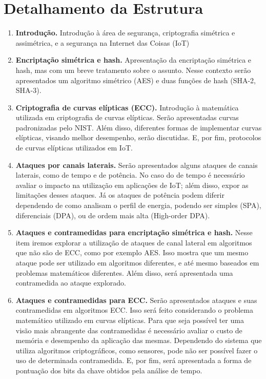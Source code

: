 \documentclass[12pt]{article}
\begin{document}
\section{Detalhamento da Estrutura}
\begin{enumerate}
\item \textbf{Introdução.} Introdu\c{c}\~ao à \'area de seguran\c{c}a, criptografia sim\'etrica e assim\'etrica, e a seguran\c{c}a na Internet das Coisas (IoT)

\item \textbf{Encripta\c{c}\~ao sim\'etrica e hash.} Apresenta\c{c}\~ao da encripta\c{c}\~ao sim\'etrica e hash, mas com um breve tratamento sobre o assunto. Nesse contexto ser\~ao apresentados um algoritmo sim\'etrico (AES) e duas funções de hash (SHA-2, SHA-3).

\item \textbf{Criptografia de curvas el\'ipticas (ECC).} Introdu\c{c}\~ao \`a matem\'atica utilizada em criptografia de curvas el\'ipticas. Ser\~ao apresentadas curvas padronizadas pelo NIST. Al\'em disso, diferentes formas de implementar curvas el\'ipticas, visando melhor desempenho, serão discutidas. E, por fim, protocolos de curvas el\'ipticas utilizados em IoT.

\item \textbf{Ataques por canais laterais.} Ser\~ao apresentados alguns ataques de canais laterais, como de tempo e de pot\^encia. No caso do de tempo \'e necess\'ario avaliar o impacto na utiliza\c{c}\~ao em aplica\c{c}\~oes de IoT; al\'em disso, expor as limita\c{c}\~oes desses ataques. J\'a os ataques de pot\^encia podem diferir  dependendo de como analisam o perfil de energia, podendo ser simples (SPA), diferenciais (DPA), ou de ordem mais alta (High-order DPA).

\item \textbf{Ataques e contramedidas para encripta\c{c}\~ao sim\'etrica e hash.} Nesse item iremos explorar a utiliza\c{c}\~ao de ataques de canal lateral em algoritmos que n\~ao s\~ao de ECC, como por exemplo AES. Isso mostra que um mesmo ataque pode ser utilizado em algoritmos diferentes, e at\'e mesmo baseados em problemas matem\'aticos diferentes. Al\'em disso, ser\'a apresentada uma contramedida ao ataque explorado.

\item \textbf{Ataques e contramedidas para ECC.} Ser\~ao apresentados ataques e suas contramedidas em algoritmos ECC. Isso ser\'a feito considerando o problema matem\'atico utilizado em curvas el\'ipticas. Para que seja poss\'ivel ter uma vis\~ao mais abrangente das contramedidas \'e necess\'ario avaliar o custo de mem\'oria e desempenho da aplica\c{c}\~ao das mesmas. Dependendo do sistema que utiliza algoritmos criptogr\'aficos, como sensores, pode n\~ao ser poss\'ivel fazer o uso de determinada contramedida. E, por fim, ser\'a apresentada a forma de pontua\c{c}\~ao dos bits da chave obtidos pela an\'alise de tempo.


\end{enumerate}
\end{document}

